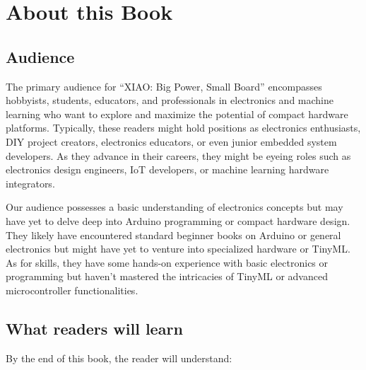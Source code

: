 \documentclass[
  letterpaper,
  DIV=11,
  numbers=noendperiod]{scrreprt}
\begin{document}
\hypertarget{about-this-book}{%
\chapter*{About this Book}\label{about-this-book}}


\hypertarget{audience}{%
\section*{Audience}\label{audience}}


The primary audience for ``XIAO: Big Power, Small Board'' encompasses
hobbyists, students, educators, and professionals in electronics and
machine learning who want to explore and maximize the potential of
compact hardware platforms. Typically, these readers might hold
positions as electronics enthusiasts, DIY project creators, electronics
educators, or even junior embedded system developers. As they advance in
their careers, they might be eyeing roles such as electronics design
engineers, IoT developers, or machine learning hardware integrators.

Our audience possesses a basic understanding of electronics concepts but
may have yet to delve deep into Arduino programming or compact hardware
design. They likely have encountered standard beginner books on Arduino
or general electronics but might have yet to venture into specialized
hardware or TinyML. As for skills, they have some hands-on experience
with basic electronics or programming but haven't mastered the
intricacies of TinyML or advanced microcontroller functionalities.

\hypertarget{what-readers-will-learn}{%
\section*{What readers will learn}\label{what-readers-will-learn}}


By the end of this book, the reader will understand:
\end{document}
